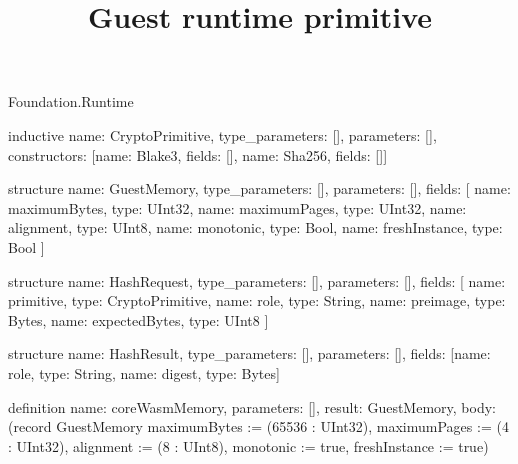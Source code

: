 \begin{lexlean}{Foundation.Runtime}
\title{Guest runtime primitive}
\begin{semanticmodule}
inductive{
  name: CryptoPrimitive,
  type_parameters: [],
  parameters: [],
  constructors: [{name: Blake3, fields: []}, {name: Sha256, fields: []}]
}

structure{
  name: GuestMemory,
  type_parameters: [],
  parameters: [],
  fields: [
    {name: maximumBytes, type: UInt32},
    {name: maximumPages, type: UInt32},
    {name: alignment, type: UInt8},
    {name: monotonic, type: Bool},
    {name: freshInstance, type: Bool}
  ]
}

structure{
  name: HashRequest,
  type_parameters: [],
  parameters: [],
  fields: [
    {name: primitive, type: CryptoPrimitive},
    {name: role, type: String},
    {name: preimage, type: Bytes},
    {name: expectedBytes, type: UInt8}
  ]
}

structure{
  name: HashResult,
  type_parameters: [],
  parameters: [],
  fields: [{name: role, type: String}, {name: digest, type: Bytes}]
}

definition{
  name: coreWasmMemory,
  parameters: [],
  result: GuestMemory,
  body: (record GuestMemory {maximumBytes := (65536 : UInt32), maximumPages := (4 : UInt32), alignment := (8 : UInt8), monotonic := true, freshInstance := true})
}
\end{semanticmodule}
\end{lexlean}
